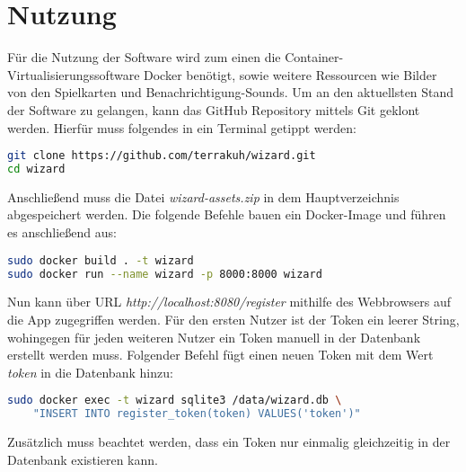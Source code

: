 \chapter{Nutzung}
Für die Nutzung der Software wird zum einen die Container-Virtualisierungssoftware Docker benötigt, sowie weitere Ressourcen wie Bilder von den Spielkarten und Benachrichtigung-Sounds. Um an den aktuellsten Stand der Software zu gelangen, kann das GitHub Repository mittels Git geklont werden. Hierfür muss folgendes in ein Terminal getippt werden:

\begin{lstlisting}[language=bash]
git clone https://github.com/terrakuh/wizard.git
cd wizard
\end{lstlisting}

Anschließend muss die Datei \textit{wizard-assets.zip} in dem Hauptverzeichnis abgespeichert werden. Die folgende Befehle bauen ein Docker-Image und führen es anschließend aus:

\begin{lstlisting}[language=bash]
sudo docker build . -t wizard
sudo docker run --name wizard -p 8000:8000 wizard
\end{lstlisting}

Nun kann über URL \textit{http://localhost:8080/register} mithilfe des Webbrowsers auf die App zugegriffen werden. Für den ersten Nutzer ist der Token ein leerer String, wohingegen für jeden weiteren Nutzer ein Token manuell in der Datenbank erstellt werden muss. Folgender Befehl fügt einen neuen Token mit dem Wert \textit{token} in die Datenbank hinzu:

\begin{lstlisting}[language=bash]
sudo docker exec -t wizard sqlite3 /data/wizard.db \
	"INSERT INTO register_token(token) VALUES('token')"
\end{lstlisting}

Zusätzlich muss beachtet werden, dass ein Token nur einmalig gleichzeitig in der Datenbank existieren kann.